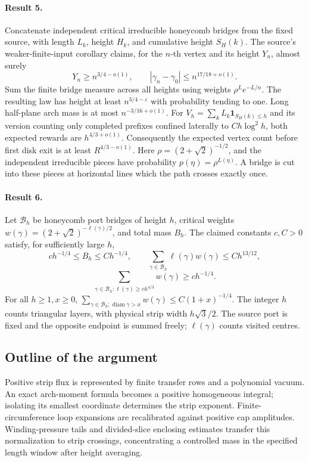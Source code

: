 \documentclass[11pt]{article}
\begin{document}
\paragraph{Result 5.} Concatenate independent critical irreducible honeycomb bridges from the fixed source, with length \(L_k\), height \(H_k\), and cumulative height \(S_H(k)\). The source's weaker-finite-input corollary claims, for the \(n\)-th vertex and its height \(Y_n\), almost surely
\[
 Y_n\ge n^{3/4-o(1)},\qquad|\gamma_n-\gamma_0|\le n^{17/18+o(1)}.
\]
Sum the finite bridge measure across all heights using weights \(\rho^Le^{-L/n}\). The resulting law has height at least \(n^{3/4-\varepsilon}\) with probability tending to one. Long half-plane arch mass is at most \(n^{-3/16+o(1)}\). For \(V_h=\sum_kL_k\mathbf1_{S_H(k)\le h}\) and its version counting only completed prefixes confined laterally to \(Ch\log^2h\), both expected rewards are \(h^{4/3+o(1)}\). Consequently the expected vertex count before first disk exit is at least \(R^{4/3-o(1)}\). Here $\rho=(2+\sqrt2)^{-1/2}$, and the independent irreducible pieces have probability $p(\eta)=\rho^{L(\eta)}$. A bridge is cut into these pieces at horizontal lines which the path crosses exactly once.

\paragraph{Result 6.} Let \(\mathcal B_h\) be honeycomb port bridges of height \(h\), critical weights \(w(\gamma)=(2+\sqrt2)^{-\ell(\gamma)/2}\), and total mass \(B_h\). The claimed constants \(c,C>0\) satisfy, for sufficiently large \(h\),
\[
 ch^{-1/4}\le B_h\le Ch^{-1/4},\qquad
 \sum_{\gamma\in\mathcal B_h}\ell(\gamma)w(\gamma)\le Ch^{13/12},
\]
\[
 \sum_{\gamma\in\mathcal B_h:\ell(\gamma)\ge ch^{4/3}}w(\gamma)\ge ch^{-1/4}.
\]
For all \(h\ge1,x\ge0\), $\sum_{\gamma\in\mathcal B_h:\operatorname{diam}\gamma>x}w(\gamma)\le C(1+x)^{-1/4}$. The integer $h$ counts triangular layers, with physical strip width $h\sqrt3/2$. The source port is fixed and the opposite endpoint is summed freely; $\ell(\gamma)$ counts visited centres.

\subsection{Outline of the argument}
Positive strip flux is represented by finite transfer rows and a polynomial vacuum. An exact arch-moment formula becomes a positive homogeneous integral; isolating its smallest coordinate determines the strip exponent. Finite-circumference loop expansions are recalibrated against positive cap amplitudes. Winding-pressure tails and divided-slice enclosing estimates transfer this normalization to strip crossings, concentrating a controlled mass in the specified length window after height averaging.
\end{document}

